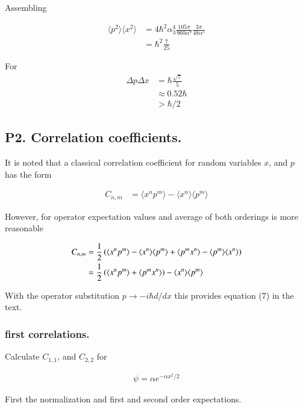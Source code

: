 \documentclass{article}
\newcommand{\expectation}[1]{\langle{#1}\rangle}
\begin{document}
Assembling

\begin{align*}
\expectation{p^2} \expectation{x^2} 
&= 4 \hbar^2 \alpha_3^4 \frac{105 \pi}{960 \alpha^9} \frac{3 \pi}{48 \alpha^5} \\
&= \hbar^2 \frac{7}{25}
\end{align*}

For
\begin{align*}
\Delta{p} \Delta{x} 
&= \hbar \frac{\sqrt{7}}{5} \\
&\approx 0.52 \hbar  \\
&> \hbar/2
\end{align*}

\subsection{ P2. Correlation coefficients. }

It is noted that a classical correlation coefficient for random variables $x$, and $p$ has the form

\begin{align*}
C_{n,m}
&= \expectation{x^n p^m} - \expectation{x^n}\expectation{p^m}
\end{align*}

However, for operator expectation values and average of both orderings is more reasonable

\begin{align*}
C_{n,m}
&= \inv{2} \left( 
\expectation{x^n p^m} - \expectation{x^n}\expectation{p^m} 
+ \expectation{p^m x^n} - \expectation{p^m}\expectation{x^n} 
\right) \\
&= \inv{2} \left( \expectation{x^n p^m} + \expectation{p^m x^n} \right) - \expectation{x^n}\expectation{p^m} 
\end{align*}

With the operator substitution $p \rightarrow -i \hbar d/dx$ this provides equation (7) in the text.

\subsubsection{ first correlations. }

Calculate $C_{1,1}$, and $C_{2,2}$ for 

\begin{align*}
\psi = \alpha e^{-\alpha x^2/2}
\end{align*}

First the normalization and first and second order expectations.
\end{document}
